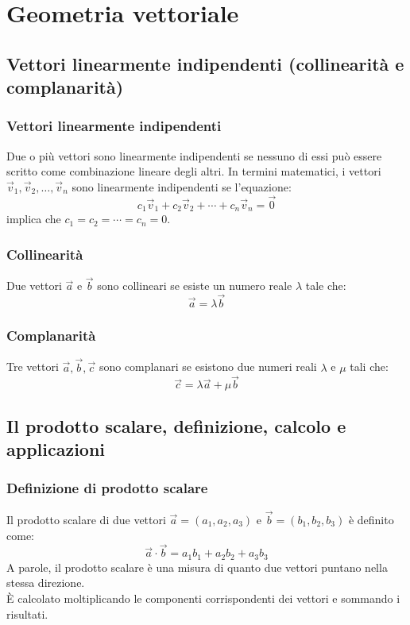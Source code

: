 \documentclass{article}
\begin{document}
\newpage
\section{Geometria vettoriale}
\subsection{Vettori linearmente indipendenti (collinearità e complanarità)}

\subsubsection{Vettori linearmente indipendenti}
Due o più vettori sono linearmente indipendenti se nessuno di essi può essere scritto come
combinazione lineare degli altri. In termini matematici, i vettori
\(\vec{v}_1, \vec{v}_2, \ldots, \vec{v}_n\) sono linearmente indipendenti se l'equazione:
\[
    c_1 \vec{v}_1 + c_2 \vec{v}_2 + \cdots + c_n \vec{v}_n = \vec{0}
\]
implica che \(c_1 = c_2 = \cdots = c_n = 0\).

\subsubsection{Collinearità}
Due vettori \(\vec{a}\) e \(\vec{b}\) sono collineari se esiste un numero reale \(\lambda\)
tale che:
\[
    \vec{a} = \lambda \vec{b}
\]

\subsubsection{Complanarità}
Tre vettori \(\vec{a}, \vec{b}, \vec{c}\) sono complanari se esistono due numeri reali
\(\lambda\) e \(\mu\) tali che:
\[
    \vec{c} = \lambda \vec{a} + \mu \vec{b}
\]


\newpage
\subsection{Il prodotto scalare, definizione, calcolo e applicazioni}

\subsubsection{Definizione di prodotto scalare}
Il prodotto scalare di due vettori \(\vec{a} = (a_1, a_2, a_3)\) e
\(\vec{b} = (b_1, b_2, b_3)\) è definito come:
\[
    \vec{a} \cdot \vec{b} = a_1 b_1 + a_2 b_2 + a_3 b_3
\]
A parole, il prodotto scalare è una misura di quanto due vettori puntano nella stessa
direzione.\\
È calcolato moltiplicando le componenti corrispondenti dei vettori e sommando i risultati.
\end{document}
